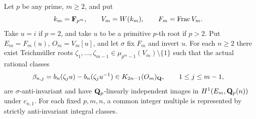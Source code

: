 \begin{proposition}
\label{d3:prop:unramifiedhighercoefficients}
Let $p$ be any prime, $m\geq2$, and put
\[
 k_m=\mathbf F_{p^m},\qquad V_m=W(k_m),\qquad F_m=\operatorname{Frac} V_m.
\]
Take $u=i$ if $p=2$, and take $u$ to be a primitive $p$-th root
if $p>2$. Put $E_m=F_m(u)$, $O_m=V_m[u]$, and let $\sigma$
fix $F_m$ and invert $u$.
For each $n\geq2$ there exist Teichm\"uller roots
$\zeta_1,\ldots,\zeta_{m-1}\in\mu_{p^m-1}(V_m)\setminus\{1\}$
such that the actual rational classes
\[
 \beta_{n,j}=b_n(\zeta_ju)-b_n(\zeta_ju^{-1})
 \in K_{2n-1}(O_m)_{\mathbf Q},\qquad 1\leq j\leq m-1,
\]
are $\sigma$-anti-invariant and have $\mathbf Q_p$-linearly independent
images in $H^1(E_m,\mathbf Q_p(n))$ under $c_{n,1}$.
For each fixed $p,m,n$, a common integer multiple is represented
by strictly anti-invariant integral classes.
\end{proposition}

